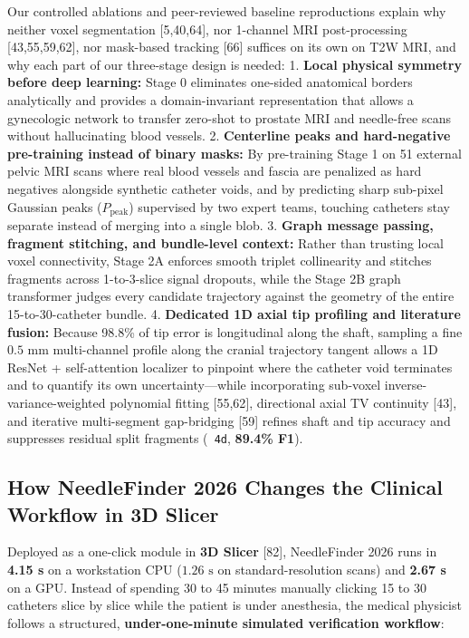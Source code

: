 \documentclass[
  11pt,
]{article}
\let\nforigtexttt\texttt
\renewcommand{\texttt}[1]{\nforigtexttt{\XeTeXinterchartokenstate=1 #1}}
\begin{document}
Our controlled ablations and peer-reviewed baseline reproductions
explain why neither voxel segmentation {[}5,40,64{]}, nor 1-channel MRI
post-processing {[}43,55,59,62{]}, nor mask-based tracking {[}66{]}
suffices on its own on T2W MRI, and why each part of our three-stage
design is needed: 1. \textbf{Local physical symmetry before deep
learning:} Stage 0 eliminates one-sided anatomical borders analytically
and provides a domain-invariant representation that allows a gynecologic
network to transfer zero-shot to prostate MRI and needle-free scans
without hallucinating blood vessels. 2. \textbf{Centerline peaks and
hard-negative pre-training instead of binary masks:} By pre-training
Stage 1 on 51 external pelvic MRI scans where real blood vessels and
fascia are penalized as hard negatives alongside synthetic catheter
voids, and by predicting sharp sub-pixel Gaussian peaks
(\(P_{\text{peak}}\)) supervised by two expert teams, touching catheters
stay separate instead of merging into a single blob. 3. \textbf{Graph
message passing, fragment stitching, and bundle-level context:} Rather
than trusting local voxel connectivity, Stage 2A enforces smooth triplet
collinearity and stitches fragments across 1-to-3-slice signal dropouts,
while the Stage 2B graph transformer judges every candidate trajectory
against the geometry of the entire 15-to-30-catheter bundle. 4.
\textbf{Dedicated 1D axial tip profiling and literature fusion:} Because
98.8\% of tip error is longitudinal along the shaft, sampling a fine
\(0.5\text{ mm}\) multi-channel profile along the cranial trajectory
tangent allows a 1D ResNet + self-attention localizer to pinpoint where
the catheter void terminates and to quantify its own uncertainty---while
incorporating sub-voxel inverse-variance-weighted polynomial fitting
{[}55,62{]}, directional axial TV continuity {[}43{]}, and iterative
multi-segment gap-bridging {[}59{]} refines shaft and tip accuracy and
suppresses residual split fragments (\texttt{4d}, \textbf{89.4\% F1}).

\subsection{How NeedleFinder 2026 Changes the Clinical Workflow in 3D
Slicer}\label{how-needlefinder-2026-changes-the-clinical-workflow-in-3d-slicer}

Deployed as a one-click module in \textbf{3D Slicer} {[}82{]},
NeedleFinder 2026 runs in \textbf{4.15 s} on a workstation CPU
(\(1.26\text{ s}\) on standard-resolution scans) and \textbf{2.67 s} on
a GPU. Instead of spending 30 to 45 minutes manually clicking 15 to 30
catheters slice by slice while the patient is under anesthesia, the
medical physicist follows a structured, \textbf{under-one-minute
simulated verification workflow}:
\end{document}
